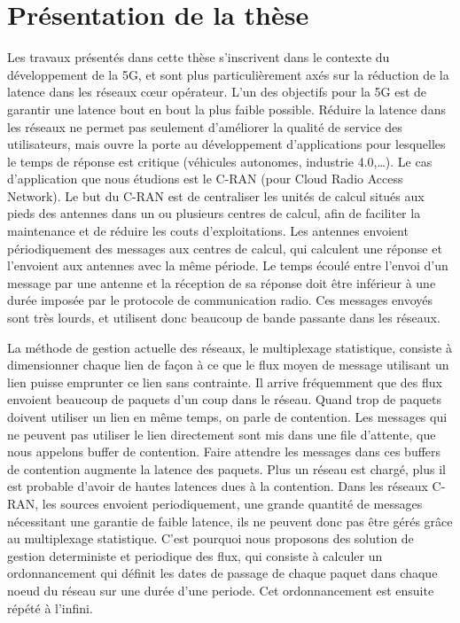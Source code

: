 
\chapter*{Présentation de la thèse}
\label{chap:introfr}


Les travaux présentés dans cette thèse s'inscrivent dans le contexte du développement de la 5G, et sont plus particulièrement axés sur la réduction de la latence dans les réseaux cœur opérateur.
L'un des objectifs pour la 5G est de garantir une latence bout en bout la plus faible possible.
Réduire la latence dans les réseaux ne permet pas seulement d'améliorer la qualité de service des utilisateurs, mais ouvre la porte au développement d'applications pour lesquelles le temps de réponse est critique (véhicules autonomes, industrie 4.0,\ldots).
Le cas d'application que nous étudions est le C-RAN (pour Cloud Radio Access Network). Le but du C-RAN est de centraliser les unités de calcul situés aux pieds des antennes dans un ou plusieurs centres de calcul, afin de faciliter la maintenance et de réduire les couts d'exploitations. Les antennes envoient périodiquement des messages aux centres de calcul, qui calculent une réponse et l'envoient aux antennes avec la même période. Le temps écoulé entre l'envoi d'un message par une antenne et la réception de sa réponse doit être inférieur à une durée imposée par le protocole de communication radio. Ces messages envoyés sont très lourds, et utilisent donc beaucoup de bande passante dans les réseaux.

La méthode de gestion actuelle des réseaux, le multiplexage statistique, consiste à dimensionner chaque lien de façon à ce que le flux moyen de message utilisant un lien puisse emprunter ce lien sans contrainte. Il arrive fréquemment que des flux envoient beaucoup de paquets d'un coup dans le réseau. Quand trop de paquets doivent utiliser un lien en même temps, on parle de contention. Les messages qui ne peuvent pas utiliser le lien directement sont mis dans une file d'attente, que nous appelons buffer de contention. Faire attendre les messages dans ces buffers de contention augmente la latence des paquets. Plus un réseau est chargé, plus il est probable d'avoir de hautes latences dues à la contention. Dans les réseaux C-RAN, les sources envoient periodiquement, une grande quantité de messages nécessitant une garantie de faible latence, ils ne peuvent donc pas être gérés grâce au multiplexage statistique. C'est pourquoi nous proposons des solution de gestion deterministe et periodique des flux, qui consiste à calculer un ordonnancement qui définit les dates de passage de chaque paquet dans chaque noeud du réseau sur une durée d'une periode. Cet ordonnancement est ensuite répété à l'infini.

